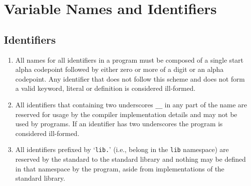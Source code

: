 \section{Variable Names and Identifiers}

\subsection{Identifiers}\label{ssec: Identifiers}
\begin{enumerate}
	\item All names for all identifiers in a \lepix{} program must be composed of a single start alpha codepoint followed by either zero or more of a digit or an alpha codepoint. Any identifier that does not follow this scheme and does not form a valid keyword, literal or definition is considered ill-formed.
	
	\item All identifiers that containing two underscores \lstinline|__| in any part of the name are reserved for usage by the compiler implementation details and may not be used by programs. If an identifier has two underscores the program is considered ill-formed.
	
	\item All identifiers prefixed by `\lstinline|lib.|' (i.e., belong in the \lstinline|lib| namespace) are reserved by the standard to the standard library and nothing may be defined in that namespace by the program, aside from implementations of the standard library.
\end{enumerate}
